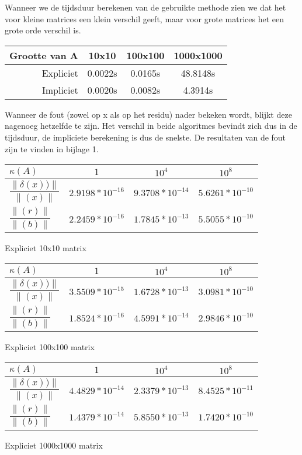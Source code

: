 Wanneer we de tijdsduur berekenen van de gebruikte methode zien we dat het voor kleine matrices een klein verschil geeft, maar voor grote matrices het een grote orde verschil is.\\[12pt]

\centering
\begin{tabular}{|r|c|c|c|}
\hline
Grootte van A & 10x10 & 100x100 & 1000x1000\\ \hline
Expliciet & 0.0022s & 0.0165s & 48.8148s\\ \hline
Impliciet & 0.0020s & 0.0082s & 4.3914s\\ \hline
\end{tabular}
\centering
{}
\label{Tijd Householder}

\begin{flushleft}
Wanneer de fout (zowel op x als op het residu) nader bekeken wordt, blijkt deze nagenoeg hetzelfde te zijn. Het verschil in beide algoritmes bevindt zich dus in de tijdsduur, de impliciete berekening is dus de snelste. De resultaten van de fout zijn te vinden in bijlage 1.\\[12pt]
\end{flushleft}
 

\centering
\begin{tabular}{|l|c|c|c|}
\hline
$\kappa(A)$ & $1$ & $10^4$ & $10^8$ \\ \hline
$\dfrac{\|\delta(x))\|}{\|(x)\|}  $ & $2.9198*10^{-16}$ & $9.3708*10^{-14}$ & $5.6261*10^{-10}$ \\ \hline
$\dfrac{\|(r)\|}{\|(b)\|}$ & $2.2459*10^{-16}$ & $1.7845*10^{-13}$ & $5.5055*10^{-10}$ \\ \hline
\end{tabular}
\caption{Expliciet 10x10 matrix}


\begin{tabular}{|l|c|c|c|}
\hline
$\kappa(A)$ & $1$ & $10^4$ & $10^8$ \\ \hline
$\dfrac{\|\delta(x))\|}{\|(x)\|}  $ & $3.5509*10^{-15}$ & $1.6728*10^{-13}$ & $3.0981*10^{-10}$ \\ \hline
$\dfrac{\|(r)\|}{\|(b)\|}$ & $1.8524*10^{-16}$ & $4.5991*10^{-14}$ & $2.9846*10^{-10}$ \\ \hline
\end{tabular}
\caption{Expliciet 100x100 matrix}


\begin{tabular}{|l|c|c|c|}
\hline
$\kappa(A)$ & $1$ & $10^4$ & $10^8$ \\ \hline
$\dfrac{\|\delta(x))\|}{\|(x)\|}  $ & $4.4829*10^{-14}$ & $2.3379*10^{-13}$ & $8.4525*10^{-11}$ \\ \hline
$\dfrac{\|(r)\|}{\|(b)\|}$ & $1.4379*10^{-14}$ & $5.8550*10^{-13}$ & $1.7420*10^{-10}$ \\ \hline
\end{tabular}
\caption{Expliciet 1000x1000 matrix}

